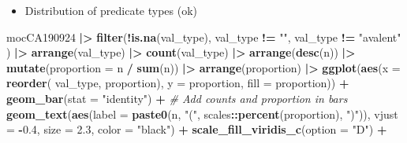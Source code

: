 \documentclass[
]{article}
\newenvironment{Shaded}{\begin{snugshade}}{\end{snugshade}}
\newcommand{\AttributeTok}[1]{\textcolor[rgb]{0.13,0.29,0.53}{#1}}
\newcommand{\CommentTok}[1]{\textcolor[rgb]{0.56,0.35,0.01}{\textit{#1}}}
\newcommand{\FloatTok}[1]{\textcolor[rgb]{0.00,0.00,0.81}{#1}}
\newcommand{\FunctionTok}[1]{\textcolor[rgb]{0.13,0.29,0.53}{\textbf{#1}}}
\newcommand{\NormalTok}[1]{#1}
\newcommand{\SpecialCharTok}[1]{\textcolor[rgb]{0.81,0.36,0.00}{\textbf{#1}}}
\newcommand{\StringTok}[1]{\textcolor[rgb]{0.31,0.60,0.02}{#1}}
\providecommand{\tightlist}{%
  \setlength{\itemsep}{0pt}\setlength{\parskip}{0pt}}
\begin{document}
\begin{itemize}
\tightlist
\item
  Distribution of predicate types (ok)
\end{itemize}

\begin{Shaded}
\begin{Highlighting}[]
\NormalTok{mocCA190924 }\SpecialCharTok{|\textgreater{}} 
  \FunctionTok{filter}\NormalTok{(}\SpecialCharTok{!}\FunctionTok{is.na}\NormalTok{(val\_type), val\_type }\SpecialCharTok{!=} \StringTok{""}\NormalTok{, val\_type }\SpecialCharTok{!=} \StringTok{"avalent"}\NormalTok{ ) }\SpecialCharTok{|\textgreater{}}
  \FunctionTok{arrange}\NormalTok{(val\_type) }\SpecialCharTok{|\textgreater{}} 
   \FunctionTok{count}\NormalTok{(val\_type) }\SpecialCharTok{|\textgreater{}} 
    \FunctionTok{arrange}\NormalTok{(}\FunctionTok{desc}\NormalTok{(n)) }\SpecialCharTok{|\textgreater{}}
  \FunctionTok{mutate}\NormalTok{(}\AttributeTok{proportion =}\NormalTok{ n }\SpecialCharTok{/} \FunctionTok{sum}\NormalTok{(n)) }\SpecialCharTok{|\textgreater{}}
  \FunctionTok{arrange}\NormalTok{(proportion) }\SpecialCharTok{|\textgreater{}}
\FunctionTok{ggplot}\NormalTok{(}\FunctionTok{aes}\NormalTok{(}\AttributeTok{x =} \FunctionTok{reorder}\NormalTok{( val\_type, proportion), }\AttributeTok{y =}\NormalTok{ proportion, }\AttributeTok{fill =}\NormalTok{ proportion)) }\SpecialCharTok{+}
  \FunctionTok{geom\_bar}\NormalTok{(}\AttributeTok{stat =} \StringTok{"identity"}\NormalTok{) }\SpecialCharTok{+}
\CommentTok{\# Add counts and proportion in bars  }
\FunctionTok{geom\_text}\NormalTok{(}\FunctionTok{aes}\NormalTok{(}\AttributeTok{label =} \FunctionTok{paste0}\NormalTok{(n, }\StringTok{"("}\NormalTok{, scales}\SpecialCharTok{::}\FunctionTok{percent}\NormalTok{(proportion), }\StringTok{")"}\NormalTok{)), }
            \AttributeTok{vjust =} \SpecialCharTok{{-}}\FloatTok{0.4}\NormalTok{,}
            \AttributeTok{size  =} \FloatTok{2.3}\NormalTok{,}
            \AttributeTok{color =} \StringTok{"black"}\NormalTok{) }\SpecialCharTok{+}
   \FunctionTok{scale\_fill\_viridis\_c}\NormalTok{(}\AttributeTok{option =} \StringTok{"D"}\NormalTok{) }\SpecialCharTok{+}
  

\end{Highlighting}
\end{Shaded}
\end{document}
